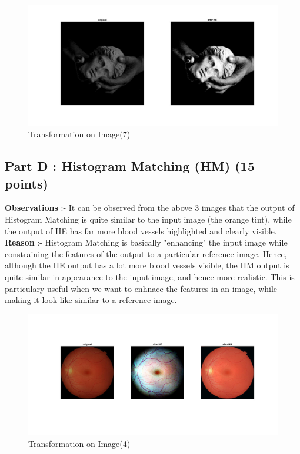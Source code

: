 \documentclass[12pt, a4paper]{article}
\begin{document}
\renewcommand{\thefigure}{3.7}
\begin{figure}[H]
    \centering
    \includegraphics[width=\textwidth]{c7.jpg}
    \vspace*{-50pt}
    \caption{Transformation on Image(7)}
    \label{fig:3.7}
\end{figure}

\subsection*{Part D : Histogram Matching (HM) (15 points)}
\textbf{Observations} :- It can be observed from the above 3 images that the output of Histogram Matching is quite similar to the input image (the orange tint), while the output of HE has far more blood vessels highlighted and clearly visible.
 \\
\textbf{Reason} :- Histogram Matching is basically "enhancing" the input image while constraining the features of the output to a particular reference image. Hence, although the HE output has a lot more blood vessels visible, the HM output is quite similar in appearance to the input image, and hence more realistic. This is particulary useful when we want to enhnace the features in an image, while making it look like similar to a reference image.
 \\
\renewcommand{\thefigure}{4.1}
\begin{figure}[H]
    \centering
    \includegraphics[width=\textwidth]{d4.jpg}
    \vspace*{-80pt}
    \caption{Transformation on Image(4)}
    \label{fig:4.1}
\end{figure}
\end{document}
